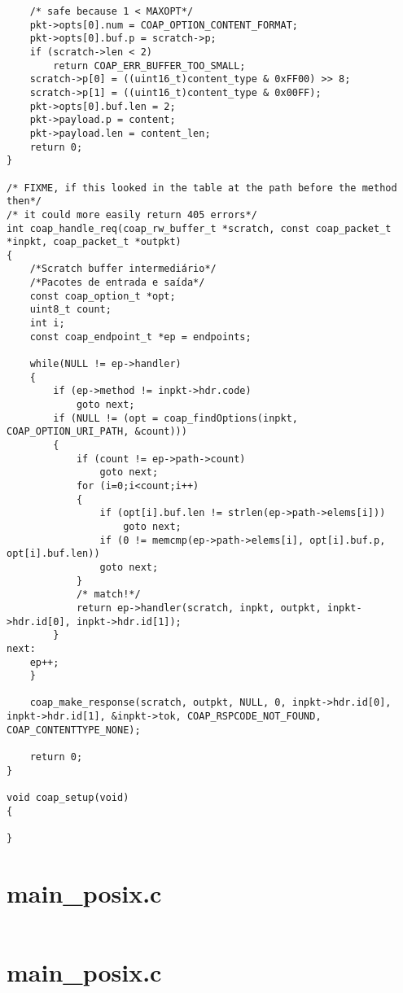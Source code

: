 \begin{lstlisting}
	/* safe because 1 < MAXOPT*/
	pkt->opts[0].num = COAP_OPTION_CONTENT_FORMAT;
	pkt->opts[0].buf.p = scratch->p;
	if (scratch->len < 2)
		return COAP_ERR_BUFFER_TOO_SMALL;
	scratch->p[0] = ((uint16_t)content_type & 0xFF00) >> 8;
	scratch->p[1] = ((uint16_t)content_type & 0x00FF);
	pkt->opts[0].buf.len = 2;
	pkt->payload.p = content;
	pkt->payload.len = content_len;
	return 0;
}

/* FIXME, if this looked in the table at the path before the method then*/
/* it could more easily return 405 errors*/
int coap_handle_req(coap_rw_buffer_t *scratch, const coap_packet_t *inpkt, coap_packet_t *outpkt)
{
	/*Scratch buffer intermediário*/
	/*Pacotes de entrada e saída*/
	const coap_option_t *opt;
	uint8_t count;
	int i;
	const coap_endpoint_t *ep = endpoints;
	
	while(NULL != ep->handler)
	{
		if (ep->method != inpkt->hdr.code)
			goto next;
		if (NULL != (opt = coap_findOptions(inpkt, COAP_OPTION_URI_PATH, &count)))
		{
			if (count != ep->path->count)
				goto next;
			for (i=0;i<count;i++)
			{
				if (opt[i].buf.len != strlen(ep->path->elems[i]))
					goto next;
				if (0 != memcmp(ep->path->elems[i], opt[i].buf.p, opt[i].buf.len))
				goto next;
			}
			/* match!*/
			return ep->handler(scratch, inpkt, outpkt, inpkt->hdr.id[0], inpkt->hdr.id[1]);
		}
next:
	ep++;
	}
	
	coap_make_response(scratch, outpkt, NULL, 0, inpkt->hdr.id[0], inpkt->hdr.id[1], &inpkt->tok, COAP_RSPCODE_NOT_FOUND, COAP_CONTENTTYPE_NONE);
	
	return 0;
}

void coap_setup(void)
{

}
\end{lstlisting}

\tocless\section{main\_posix.c}

\begin{lstlisting}

\end{lstlisting}

\tocless\section{main\_posix.c}

\begin{lstlisting}

\end{lstlisting}